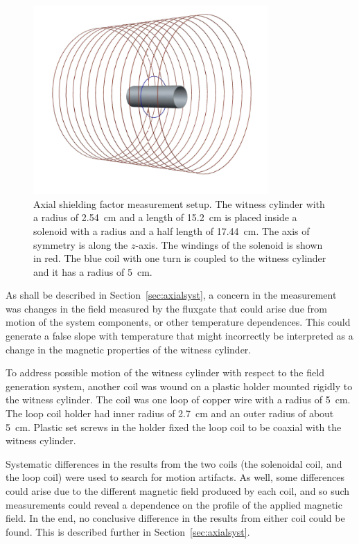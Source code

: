 \begin{figure}
\begin{center}
   \includegraphics[width=0.8\textwidth]{geometry.PNG}
    \caption{Axial shielding factor measurement setup. The witness
      cylinder with a radius of 2.54~cm and a length of 15.2~cm is placed
      inside a solenoid with a radius and a half length of
      17.44~cm. The axis of symmetry is along the $z$-axis. The
      windings of the solenoid is shown in red. The blue coil with one
      turn is coupled to the witness cylinder and it has a radius of
      5~cm.  }
    \label{fig:geometry}
    \end{center}
\end{figure}

As shall be described in Section~\ref{sec:axialsyst}, a concern in the
measurement was changes in the field measured by the fluxgate that
could arise due from motion of the system components, or other
temperature dependences.  This could generate a false slope with
temperature that might incorrectly be interpreted as a change in the
magnetic properties of the witness cylinder.

To address possible motion of the witness cylinder with respect to the
field generation system, another coil was wound on a plastic holder
mounted rigidly to the witness cylinder.  The coil was one loop of
copper wire with a radius of 5~cm. The loop coil holder had inner
radius of 2.7~cm and an outer radius of about 5~cm.  Plastic set
screws in the holder fixed the loop coil to be coaxial with the
witness cylinder.

Systematic differences in the results from the two coils (the
solenoidal coil, and the loop coil) were used to search for motion
artifacts.  As well, some differences could arise due to the different
magnetic field produced by each coil, and so such measurements could
reveal a dependence on the profile of the applied magnetic field.  In
the end, no conclusive difference in the results from either coil
could be found.  This is described further in
Section~\ref{sec:axialsyst}.


